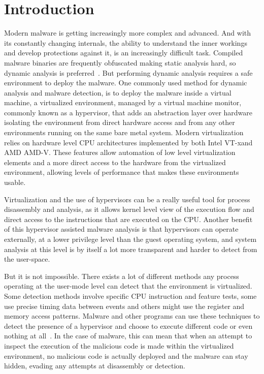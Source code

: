 \section{Introduction}\label{s:intro}

Modern malware is getting increasingly more complex and advanced.
And with its constantly changing internals, the ability to understand the inner workings and develop protections against it, is an increasingly difficult task. 
Compiled malware binaries are frequently obfuscated making static analysis hard, so dynamic analysis is preferred~\cite{Leon2021}. But performing dynamic analysis requires a safe environment 
to deploy the malware. One commonly used method for dynamic analysis and malware detection, is to deploy the malware inside a virtual machine, a virtualized environment, managed by a virtual machine monitor, 
commonly known as a hypervisor, that adds an abstraction layer over hardware isolating the environment from direct hardware access and from any other environments running on the same bare metal system. 
Modern virtualization relies on hardware level CPU architectures implemented by both Intel\textsuperscript{\tiny\textregistered} VT-x\texttrademark and AMD\textsuperscript{\tiny\textregistered} AMD-V\texttrademark. 
These features allow automation of low level virtualization elements and a more direct access to the hardware from the virtualized environment, allowing levels of performance that makes these environments usable.

Virtualization and the use of hypervisors can be a really useful tool for process disassembly and analysis, as it allows kernel level view of the execution flow and direct access to the instructions that are executed on the CPU.
Another benefit of this hypervisor assisted malware analysis is that hypervisors can operate externally, at a lower privilege level than the guest operating system, 
and system analysis at this level is by itself a lot more transparent and harder to detect from the user-space.

But it is not impossible. There exists a lot of different methods any process operating at the user-mode level can detect that the environment is virtualized. 
Some detection methods involve specific CPU instruction and feature tests, some use precise timing data between events and others might use the register and memory access patterns. 
Malware and other programs can use these techniques to detect the presence of a hypervisor and choose to execute different code or even nothing at all~\cite{10.1109/TIFS.2020.2976559}. 
In the case of malware, this can mean that when an attempt to inspect the execution of the malicious code is made within the virtualized environment, 
no malicious code is actually deployed and the malware can stay hidden, evading any attempts at disassembly or detection.

